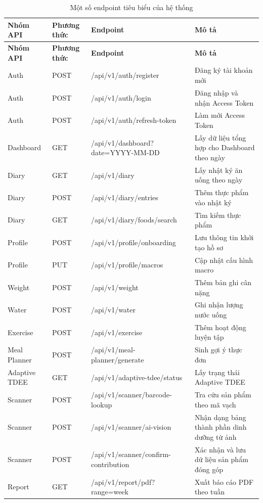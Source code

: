 \documentclass[12pt, a4paper]{report}
\begin{document}
\begin{longtable}{|>{\raggedright\arraybackslash}p{2.0cm}|>{\raggedright\arraybackslash}p{1.5cm}|>{\raggedright\arraybackslash}p{5.5cm}|>{\raggedright\arraybackslash}p{5.0cm}|}
\caption{Một số endpoint tiêu biểu của hệ thống}
\label{tab:endpoint_tieu_bieu} \\
\hline
\textbf{Nhóm API} & \textbf{Phương thức} & \textbf{Endpoint} & \textbf{Mô tả} \\
\hline
\endfirsthead
\hline
\textbf{Nhóm API} & \textbf{Phương thức} & \textbf{Endpoint} & \textbf{Mô tả} \\
\hline
\endhead

Auth & POST & /api/v1/auth/register & Đăng ký tài khoản mới \\
\hline
Auth & POST & /api/v1/auth/login & Đăng nhập và nhận Access Token \\
\hline
Auth & POST & /api/v1/auth/refresh-token & Làm mới Access Token \\
\hline
Dashboard & GET & /api/v1/dashboard?date=YYYY-MM-DD & Lấy dữ liệu tổng hợp cho Dashboard theo ngày \\
\hline
Diary & GET & /api/v1/diary & Lấy nhật ký ăn uống theo ngày \\
\hline
Diary & POST & /api/v1/diary/entries & Thêm thực phẩm vào nhật ký \\
\hline
Diary & GET & /api/v1/diary/foods/search & Tìm kiếm thực phẩm \\
\hline
Profile & POST & /api/v1/profile/onboarding & Lưu thông tin khởi tạo hồ sơ \\
\hline
Profile & PUT & /api/v1/profile/macros & Cập nhật cấu hình macro \\
\hline
Weight & POST & /api/v1/weight & Thêm bản ghi cân nặng \\
\hline
Water & POST & /api/v1/water & Ghi nhận lượng nước uống \\
\hline
Exercise & POST & /api/v1/exercise & Thêm hoạt động luyện tập \\
\hline
Meal Planner & POST & /api/v1/meal-planner/generate & Sinh gợi ý thực đơn \\
\hline
Adaptive TDEE & GET & /api/v1/adaptive-tdee/status & Lấy trạng thái Adaptive TDEE \\
\hline
Scanner & POST & /api/v1/scanner/barcode-lookup & Tra cứu sản phẩm theo mã vạch \\
\hline
Scanner & POST & /api/v1/scanner/ai-vision & Nhận dạng bảng thành phần dinh dưỡng từ ảnh \\
\hline
Scanner & POST & /api/v1/scanner/confirm-contribution & Xác nhận và lưu dữ liệu sản phẩm đóng góp \\
\hline
Report & GET & /api/v1/report/pdf?range=week & Xuất báo cáo PDF theo tuần \\
\hline
\end{longtable}
\end{document}
